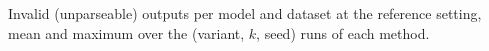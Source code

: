 \begin{table}[t]
  \centering
  \scriptsize
  \setlength{\tabcolsep}{3pt}
  \resizebox{\textwidth}{!}{}
  \caption{Invalid (unparseable) outputs per model and dataset at the reference setting, mean and maximum over the (variant, $k$, seed) runs of each method.}
  \label{tab:invalid}
\end{table}
